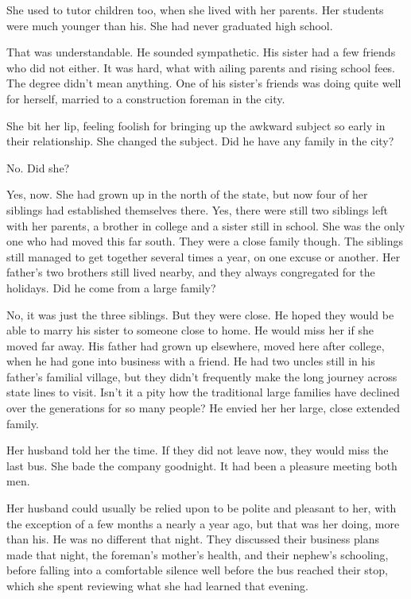 \documentclass{article}
\newcommand{\egnote}{\todo[color=violet!30]}
\begin{document}
She used to tutor children too, when she lived with her parents. Her students were much younger than his. She had never graduated high school. 

That was understandable. He sounded sympathetic. His sister had a few friends who did not either. It was hard, what with ailing parents and rising school fees. The degree didn't mean anything. One of his sister's friends was doing quite well for herself, married to a construction foreman in the city.

She bit her lip, feeling foolish for bringing up the awkward subject so early in their relationship. She changed the subject. Did he have any family in the city? 

No. Did she? 

Yes, now. She had grown up in the north of the state, but now four of her siblings had established themselves there. Yes, there were still two siblings left with her parents, a brother in college and a sister still in school. She was the only one who had moved this far south. They were a close family though. The siblings still managed to get together several times a year, on one excuse or another. Her father's two brothers still lived nearby, and they always congregated for the holidays. Did he come from a large family?

No, it was just the three siblings. But they were close. He hoped they would be able to marry his sister to someone close to home. He would miss her if she moved far away. His father had grown up elsewhere, moved here after college, when he had gone into business with a friend. He had two uncles still in his father's familial village, but they didn't frequently make the long journey across state lines to visit. Isn't it a pity how the traditional large families have declined over the generations for so many people? He envied her her large, close extended family.
\egnote{pace slows a bit in this dialog. Can maybe trim it a bit?}

Her husband told her the time. If they did not leave now, they would miss the last bus. She bade the company goodnight. It had been a pleasure meeting both men. 

Her husband could usually be relied upon to be polite and pleasant to her, with the exception of a few months a nearly a year ago, but that was her doing, more than his. He was no different that night. They discussed their business plans made that night, the foreman's mother's health, and their nephew's schooling, before falling into a comfortable silence well before the bus reached their stop, which she spent reviewing what she had learned that evening.
\end{document}
